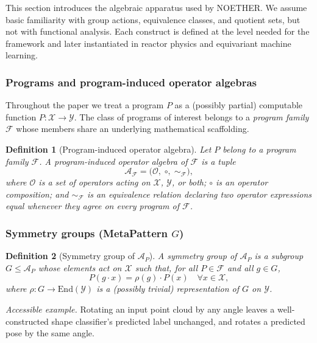\documentclass[acmsmall,screen,review]{acmart}
\newtheorem{definition}{Definition}
\begin{document}
This section introduces the algebraic apparatus used by NOETHER. We assume basic familiarity with group actions, equivalence classes, and quotient sets, but not with functional analysis. Each construct is defined at the level needed for the framework and later instantiated in reactor physics and equivariant machine learning.

\subsubsection{Programs and program-induced operator algebras}

Throughout the paper we treat a program $P$ as a (possibly partial) computable function $P: \mathcal{X} \to \mathcal{Y}$. The class of programs of interest belongs to a \emph{program family} $\mathcal{F}$ whose members share an underlying mathematical scaffolding.

\begin{definition}[Program-induced operator algebra]
Let $P$ belong to a program family $\mathcal{F}$. A \emph{program-induced operator algebra} of $\mathcal{F}$ is a tuple
$$\mathcal{A}_{\mathcal{F}} = \bigl(\mathcal{O}, \;\circ, \;\sim_{\mathcal{F}}\bigr),$$
where $\mathcal{O}$ is a set of operators acting on $\mathcal{X}$, $\mathcal{Y}$, or both; $\circ$ is an operator composition; and $\sim_{\mathcal{F}}$ is an equivalence relation declaring two operator expressions equal whenever they agree on every program of $\mathcal{F}$.
\end{definition}

\subsubsection{Symmetry groups (MetaPattern $G$)}

\begin{definition}[Symmetry group of $\mathcal{A}_P$]
A \emph{symmetry group} of $\mathcal{A}_P$ is a subgroup $G \le \mathcal{A}_P$ whose elements act on $\mathcal{X}$ such that, for all $P \in \mathcal{F}$ and all $g \in G$,
$$P(g \cdot x) = \rho(g) \cdot P(x) \quad \forall x \in \mathcal{X},$$
where $\rho: G \to \mathrm{End}(\mathcal{Y})$ is a (possibly trivial) representation of $G$ on $\mathcal{Y}$.
\end{definition}

\emph{Accessible example.} Rotating an input point cloud by any angle leaves a well-constructed shape classifier's predicted label unchanged, and rotates a predicted pose by the same angle.
\end{document}
